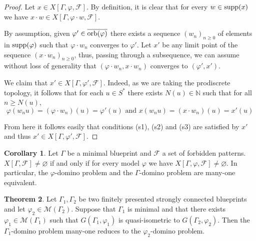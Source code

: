 \documentclass{article}
\theoremstyle{definition}
\newtheorem{theorem}{Theorem}[section] %
\newtheorem{corollary}[theorem]{Corollary}
\theoremstyle{definition}
\newcommand{\N}{\mathbb{N}}
\newcommand{\M}{\mathcal{M}}
\newcommand{\FF}{\mathcal{F}}
\newcommand{\Fo}{\mathcal{F}}
\newcommand{\orb}{\textnormal{orb}}
\newcommand{\supp}{\textnormal{supp}}
\begin{document}
\begin{proof}
    Let  $x\in X[\Gamma,\varphi,\Fo]$. By definition, it is clear that for every $w \in \supp(x)$ we have $x\cdot w \in X[\Gamma,\varphi \cdot w,\Fo]$.
    
    By assumption, given $\varphi'\in\overline{\orb(\varphi)}$ there exists a sequence $(w_n)_{n \geq 0}$ of elements in $\supp(\varphi)$ such that $\varphi \cdot w_n$ converges to $\varphi'$. Let $x'$ be any limit point of the sequence $(x\cdot w_n)_{n \geq 0}$, thus, passing through a subsequence, we can assume without loss of generality that $(\varphi \cdot w_n,x\cdot w_n)$ converges to $(\varphi',x')$.
    
    
    We claim that $x'\in X[\Gamma,\varphi',\FF]$. Indeed, as we are taking the prodiscrete topology, it follows that for each $u\in S^*$ there exists $N(u)\in\N$ such that for all $n\geq N(u)$,
    $$\varphi(w_nu) = (\varphi \cdot w_n)(u) = \varphi'(u) \mbox{ and } x(w_nu) = (x\cdot w_n)(u) = x'(u)$$

    From here it follows easily that conditions (s1), (s2) and (s3) are satisfied by $x'$ and thus $x'\in X[\Gamma,\varphi',\FF]$.\end{proof}

    \begin{corollary}\label{coro:minimalongo}
        Let $\Gamma$ be a minimal blueprint and $\Fo$ a set of forbidden patterns. $X[\Gamma,\Fo]\neq\varnothing$ if and only if for every model $\varphi$ we have $X[\Gamma,\varphi,\Fo]\neq\varnothing$. In particular, the $\varphi$-domino problem and the $\Gamma$-domino problem are many-one equivalent.
    \end{corollary}

    \begin{theorem}\label{thm:domino_model}
        Let $\Gamma_1, \Gamma_2$ be two finitely presented strongly connected blueprints and let $\varphi_2 \in \M(\Gamma_2)$. Suppose that $\Gamma_1$ is minimal and that there exists $\varphi_1 \in \M(\Gamma_1)$ such that $G(\Gamma_1, \varphi_1)$ is quasi-isometric to $G(\Gamma_2,\varphi_2)$. Then the $\Gamma_1$-domino problem many-one reduces to the $\varphi_2$-domino problem.
    \end{theorem}
\end{document}
